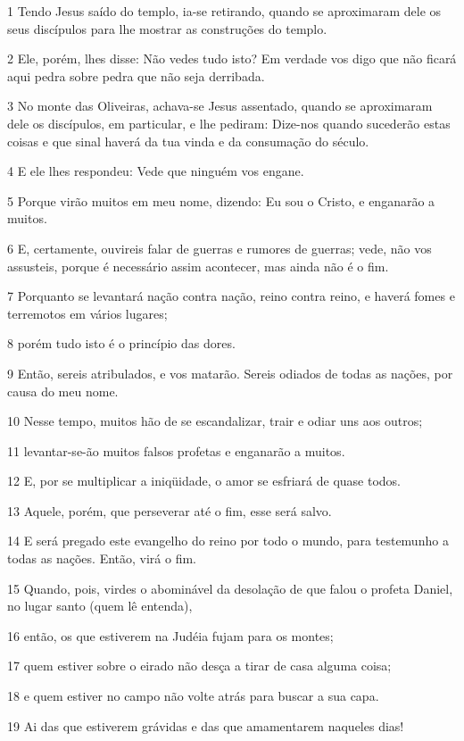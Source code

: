 \par 1 Tendo Jesus saído do templo, ia-se retirando, quando se aproximaram dele os seus discípulos para lhe mostrar as construções do templo.
\par 2 Ele, porém, lhes disse: Não vedes tudo isto? Em verdade vos digo que não ficará aqui pedra sobre pedra que não seja derribada.
\par 3 No monte das Oliveiras, achava-se Jesus assentado, quando se aproximaram dele os discípulos, em particular, e lhe pediram: Dize-nos quando sucederão estas coisas e que sinal haverá da tua vinda e da consumação do século.
\par 4 E ele lhes respondeu: Vede que ninguém vos engane.
\par 5 Porque virão muitos em meu nome, dizendo: Eu sou o Cristo, e enganarão a muitos.
\par 6 E, certamente, ouvireis falar de guerras e rumores de guerras; vede, não vos assusteis, porque é necessário assim acontecer, mas ainda não é o fim.
\par 7 Porquanto se levantará nação contra nação, reino contra reino, e haverá fomes e terremotos em vários lugares;
\par 8 porém tudo isto é o princípio das dores.
\par 9 Então, sereis atribulados, e vos matarão. Sereis odiados de todas as nações, por causa do meu nome.
\par 10 Nesse tempo, muitos hão de se escandalizar, trair e odiar uns aos outros;
\par 11 levantar-se-ão muitos falsos profetas e enganarão a muitos.
\par 12 E, por se multiplicar a iniqüidade, o amor se esfriará de quase todos.
\par 13 Aquele, porém, que perseverar até o fim, esse será salvo.
\par 14 E será pregado este evangelho do reino por todo o mundo, para testemunho a todas as nações. Então, virá o fim.
\par 15 Quando, pois, virdes o abominável da desolação de que falou o profeta Daniel, no lugar santo (quem lê entenda),
\par 16 então, os que estiverem na Judéia fujam para os montes;
\par 17 quem estiver sobre o eirado não desça a tirar de casa alguma coisa;
\par 18 e quem estiver no campo não volte atrás para buscar a sua capa.
\par 19 Ai das que estiverem grávidas e das que amamentarem naqueles dias!

